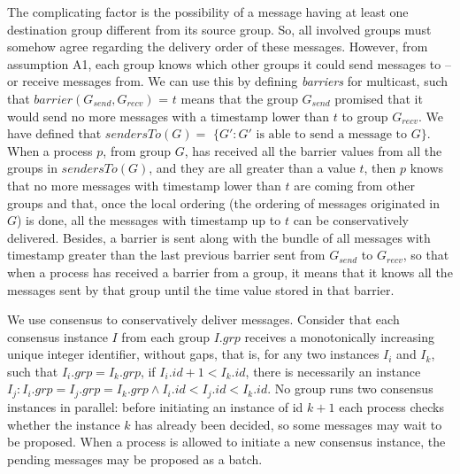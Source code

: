 \documentclass[times, 10pt]{article}
\begin{document}
The complicating factor is the possibility of a message having at least one destination group different from its source group. So, all involved groups must somehow agree regarding the delivery order of these messages. However, from assumption A1, each group knows which other groups it could send messages to -- or receive messages from. We can use this by defining \emph{barriers} for multicast, such that $barrier(G_{send},G_{recv})$ = $t$ means that the group $G_{send}$ promised that it would send no more messages with a timestamp lower than $t$ to group $G_{recv}$. We have defined that $sendersTo(G) =$ \mbox{$\{G' : G'\text{ is able to send a message to }G\}$}. When a process $p$, from group $G$, has received all the barrier values from all the groups in $sendersTo(G)$, and they are all greater than a value $t$, then $p$ knows that no more messages with timestamp lower than $t$ are coming from other groups and that, once the local ordering (the ordering of messages originated in $G$) is done, all the messages with timestamp up to $t$ can be conservatively delivered. Besides, a barrier is sent along with the bundle of all messages with timestamp greater than the last previous barrier sent from $G_{send}$ to $G_{recv}$, so that when a process has received a barrier from a group, it means that it knows all the messages sent by that group until the time value stored in that barrier. 

We use consensus to conservatively deliver messages. Consider that each consensus instance $I$ from each group $I.grp$ receives a monotonically increasing unique integer identifier, without gaps, that is, for any two instances $I_i$ and $I_k$, such that $I_i.grp = I_k.grp$, if $I_i.id + 1 < I_k.id$, there is necessarily an instance $I_j : I_i.grp = I_j.grp = I_k.grp \wedge I_i.id < I_j.id < I_k.id$. No group runs two consensus instances in parallel: before initiating an instance of id $k+1$ each process checks whether the instance $k$ has already been decided, so some messages may wait to be proposed. When a process is allowed to initiate a new consensus instance, the pending messages may be proposed as a batch.%
\end{document}
